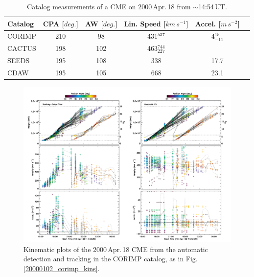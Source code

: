 \documentclass[referee,a4paper,12pt,traditabstract]{swsc}
\begin{document}
\begin{linenumbers}
\begin{table}[h]
\begin{tabular}{l*{4}{c}r}
Catalog              & CPA [$deg.$] & AW [$deg.$] & Lin. Speed [$km\,s^{-1}$] & Accel. [$m\,s^{-2}$]  \\
\hline
CORIMP      & 210 & 98 & 431$^{537}$ & 4$_{-11}^{15}$   \\
CACTUS     & 198 & 102 & 463$_{227}^{744}$ &     \\
SEEDS        & 195 & 108 & 338 & 17.7    \\
CDAW         & 195 & 105 & 668 & 23.1    \\
\end{tabular}
\caption{Catalog measurements of a CME on 2000\,Apr.\,18 from $\sim$14:54\,UT.}
\label{table_20000418}
\end{table}

\begin{figure}[t]
\centerline{\includegraphics[width=\linewidth]{images/20000418_corimp_kins.pdf}}
\caption{Kinematic plots of the 2000\,Apr.\,18 CME from the automatic detection and tracking in the CORIMP catalog, as in Fig.\,\ref{20000102_corimp_kins}.}
\label{20000418_corimp_kins}
\end{figure}


\end{linenumbers}
\end{document}
